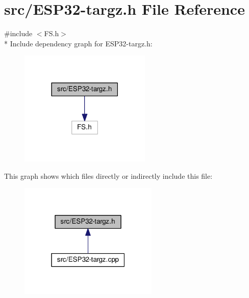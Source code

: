 \hypertarget{ESP32-targz_8h}{}\section{src/\+E\+S\+P32-\/targz.h File Reference}
\label{ESP32-targz_8h}
{\ttfamily \#include $<$F\+S.\+h$>$}\\*
Include dependency graph for E\+S\+P32-\/targz.h\+:
\nopagebreak
\begin{figure}[H]
\begin{center}
\leavevmode
\includegraphics[width=177pt]{ESP32-targz_8h__incl}
\end{center}
\end{figure}
This graph shows which files directly or indirectly include this file\+:
\nopagebreak
\begin{figure}[H]
\begin{center}
\leavevmode
\includegraphics[width=187pt]{ESP32-targz_8h__dep__incl}
\end{center}
\end{figure}
